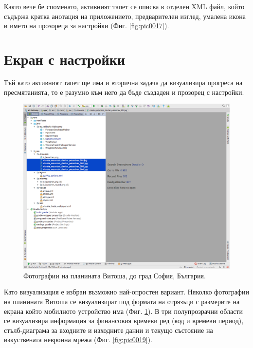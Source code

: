 \documentclass[book,14pt,oneside,openany]{memoir}
\begin{document}
Както вече бе споменато, активният тапет се описва в отделен XML файл, който съдържа кратка анотация на приложението, предварителен изглед, умалена икона и името на прозореца за настройки (Фиг. \ref{fig:pic0017}). 

\section{Екран с настройки}

Тъй като активният тапет ще има и вторична задача да визуализира прогреса на пресмятанията, то е разумно към него да бъде създаден и прозорец с настройки. 

\begin{figure}[h]
  \centering
  \includegraphics[height=0.45\pdfpageheight]{./images/pic0018.png}
  \caption{Фотографии на планината Витоша, до град София, България.}
\label{fig:pic0018}
\end{figure}
\FloatBarrier

Като визуализация е избран възможно най-опростен вариант. Няколко фотографии на планината Витоша се визуализират под формата на отрязъци с размерите на екрана който мобилното устройство има (Фиг. \ref{fig:pic0018}). В три полупрозрачни области се визуализира информация за финансовия времеви ред (код и времеви период), стълб-диаграма за входните и изходните данни и текущо състояние на изкуствената невронна мрежа (Фиг. \ref{fig:pic0019}). 
\end{document}

